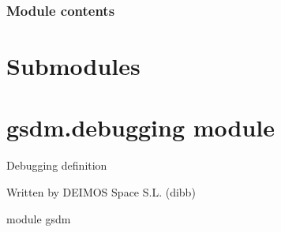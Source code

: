 \begin{fulllineitems}

\begin{fulllineitems}
\label{\detokenize{gsdm.engine:gsdm.engine.query.Query.operators}}
\end{fulllineitems}


\end{fulllineitems}


\begin{fulllineitems}
\label{\detokenize{gsdm.engine:gsdm.engine.query.log_query}}
\end{fulllineitems}



\subsubsection{Module contents}
\label{\detokenize{gsdm.engine:module-gsdm.engine}}\label{\detokenize{gsdm.engine:module-contents}}

\section{Submodules}
\label{\detokenize{gsdm:submodules}}

\section{gsdm.debugging module}
\label{\detokenize{gsdm:module-gsdm.debugging}}\label{\detokenize{gsdm:gsdm-debugging-module}}
Debugging definition

Written by DEIMOS Space S.L. (dibb)

module gsdm

